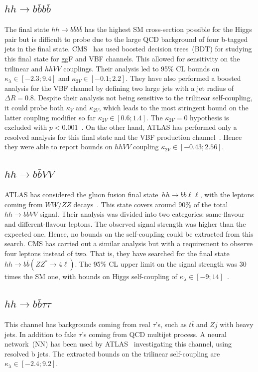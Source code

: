 \subsection*{$hh \to b\bar b b \bar b $}
The final state $ hh \to b\bar b b \bar b$ has the highest SM cross-section possible for the Higgs pair but is difficult to probe due to the large QCD background of four b-tagged jets in the final state. CMS~\cite{CMS-PAS-HIG-20-005} has used boosted decision trees~(BDT) for studying this final state for ggF and VBF channels. This allowed for sensitivity on the trilinear and $hhVV$ couplings. Their analysis led to 95\% CL bounds on $\kappa_\lambda \in [-2.3;9.4]$ and $\kappa_{2V} \in [-0.1; 2.2]$.  They have also performed a boosted analysis for the VBF channel by defining two large jets with a jet radius of $\Delta R =0.8$. Despite their analysis not being sensitive to the trilinear self-coupling, it could probe both $\kappa_V$ and  $\kappa_{2V} $, which leads to the most stringent bound on the latter coupling modifier so far  $\kappa_{2V}  \in [0.6;1.4]$. The $\kappa_{2V}=0$ hypothesis is excluded with $ p<0.001$~\cite{CMS-PAS-B2G-21-001}. On the other hand, ATLAS has performed only a resolved analysis for this final state and the VBF production channel~\cite{ATLAS:2020jgy}. Hence they were able to report bounds on $hhVV$ coupling $\kappa_{2V} \in [-0.43;2.56]$. 
\subsection*{$hh \to b\bar b VV $}
ATLAS has considered the gluon fusion final state~$hh \to b\bar b \ell \ell$, with the leptons coming from $WW/ZZ$ decays~\cite{ATLAS:2019vwv}. This state covers around $90\%$ of the total~$hh \to b\bar b VV $ signal. Their analysis was divided into two categories: same-flavour and different-flavour leptons. The observed signal strength was higher than the expected one. Hence, no bounds on the self-coupling could be extracted from this search. CMS has carried out a similar analysis but with a requirement to observe four leptons instead of two. That is, they have searched for the final state $hh \to b\bar b( ZZ^*\to 4\ell)$. The 95\% CL upper limit on the signal strength was 30 times the SM one, with bounds on Higgs self-coupling of $\kappa_\lambda \in [-9;14]$~\cite{CMS-PAS-HIG-20-004}. 
\subsection*{$hh \to b\bar b \tau \tau $}
This channel has backgrounds coming from real $\tau$'s, such as $t\bar t$ and $Z j$ with heavy jets. In addition to fake $\tau$'s coming from QCD multijet process. A neural network~(NN) has been used by ATLAS~\cite{ATLAS-CONF-2021-052} investigating this channel, using resolved b jets. The extracted bounds on the trilinear self-coupling are $\kappa_\lambda \in [-2.4;9.2]$. 
